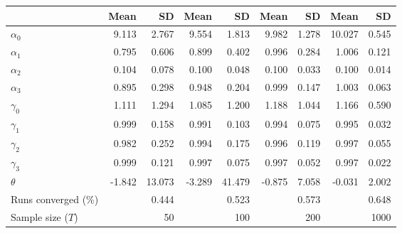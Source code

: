 
\begin{tabular}[t]{lrrrrrrrr}
\toprule
  & Mean & SD & Mean  & SD  & Mean   & SD   & Mean    & SD   \\
\midrule
$\alpha_{0}$ & 9.113 & 2.767 & 9.554 & 1.813 & 9.982 & 1.278 & 10.027 & 0.545\\
$\alpha_{1}$ & 0.795 & 0.606 & 0.899 & 0.402 & 0.996 & 0.284 & 1.006 & 0.121\\
$\alpha_{2}$ & 0.104 & 0.078 & 0.100 & 0.048 & 0.100 & 0.033 & 0.100 & 0.014\\
$\alpha_{3}$ & 0.895 & 0.298 & 0.948 & 0.204 & 0.999 & 0.147 & 1.003 & 0.063\\
$\gamma_{0}$ & 1.111 & 1.294 & 1.085 & 1.200 & 1.188 & 1.044 & 1.166 & 0.590\\
$\gamma_{1}$ & 0.999 & 0.158 & 0.991 & 0.103 & 0.994 & 0.075 & 0.995 & 0.032\\
$\gamma_{2}$ & 0.982 & 0.252 & 0.994 & 0.175 & 0.996 & 0.119 & 0.997 & 0.055\\
$\gamma_{3}$ & 0.999 & 0.121 & 0.997 & 0.075 & 0.997 & 0.052 & 0.997 & 0.022\\
$\theta$ & -1.842 & 13.073 & -3.289 & 41.479 & -0.875 & 7.058 & -0.031 & 2.002\\
Runs converged (\%) &  & 0.444 &  & 0.523 &  & 0.573 &  & 0.648\\
Sample size ($T$) &  & 50 &  & 100 &  & 200 &  & 1000\\
\bottomrule
\end{tabular}

